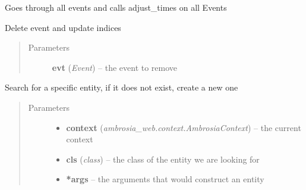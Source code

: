 \documentclass[letterpaper,10pt,english]{sphinxmanual}
\begin{document}
\begin{fulllineitems}
\begin{fulllineitems}
\label{ambrosia.model:ambrosia.model.Analysis.adjust_times}
Goes through all events and calls adjust\_times on all Events

\end{fulllineitems}


\begin{fulllineitems}
\label{ambrosia.model:ambrosia.model.Analysis.del_event}
Delete event and update indices
\begin{quote}\begin{description}
\item[{Parameters}] \leavevmode
\textbf{evt} (\emph{Event}) -- the event to remove

\end{description}\end{quote}

\end{fulllineitems}


\begin{fulllineitems}
\label{ambrosia.model:ambrosia.model.Analysis.get_entity}
Search for a specific entity, if it does not exist, create a new one
\begin{quote}\begin{description}
\item[{Parameters}] \leavevmode\begin{itemize}
\item {} 
\textbf{context} (\emph{ambrosia\_web.context.AmbrosiaContext}) -- the current context

\item {} 
\textbf{cls} (\emph{class}) -- the class of the entity we are looking for

\item {} 
\textbf{*args} -- the arguments that would construct an entity

\end{itemize}

\end{description}\end{quote}


\end{fulllineitems}
\end{fulllineitems}
\end{document}
